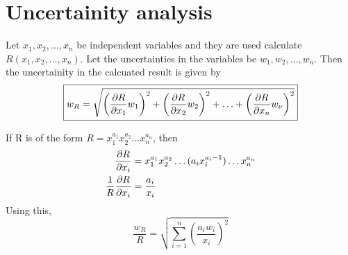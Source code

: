 \documentclass{article}
\begin{document}
\section{Uncertainity analysis}
Let $x_1, x_2, \hdots, x_n$ be independent variables and they are used calculate $R(x_1,x_2,\hdots,x_n)$. Let the uncertainties in the variables be $w_1,w_2,\hdots,w_n$. Then the uncertainity in the calcuated result is given by
	\[\boxed{w_R = \sqrt{\left(\pdv{R}{x_1} w_1 \right)^2 + \left(\pdv{R}{x_2} w_2 \right)^2 + \hdots + \left(\pdv{R}{x_n} w_\nu \right)^2 }}\]


\noindent If R is of the form $R = x_1^{a_1} x_2^{a_2} \hdots x_n^{a_n}$, then 
	\begin{align*}
		\pdv{R}{x_i} &= x_1^{a_1} x_2^{a_2} \hdots (a_i x_i^{a_i -1}) \hdots x_n^{a_n}\\
		\frac{1}{R}\pdv{R}{x_i} &= \frac{a_i}{x_i}
	\end{align*}
	Using this, 
	\[\frac{w_R}{R} = \sqrt{\sum_{i=1}^n \left(\frac{a_i w_i}{x_i} \right)^2}\]
\end{document}
